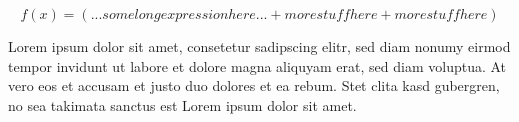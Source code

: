 \newcommand{\blah}{command definition
  goes here
and here}

\begin{equation}
  f(x) = \left(... some long expression here ...
    + more stuff here
  + more stuff here \right)
\end{equation}

Lorem ipsum {\color{red} dolor sit amet, consetetur sadipscing elitr, sed diam
  nonumy eirmod tempor invidunt ut labore et dolore magna aliquyam erat, sed
diam voluptua. At vero eos et accusam et justo duo dolores et ea rebum.} Stet
clita kasd gubergren, no sea takimata sanctus est Lorem ipsum dolor sit amet.
